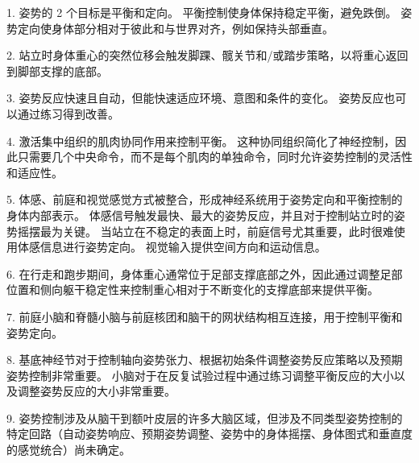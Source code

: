 1. 姿势的 2 个目标是平衡和定向。
平衡控制使身体保持稳定平衡，避免跌倒。
姿势定向使身体部分相对于彼此和与世界对齐，例如保持头部垂直。


2. 站立时身体重心的突然位移会触发脚踝、髋关节和/或踏步策略，以将重心返回到脚部支撑的底部。


3. 姿势反应快速且自动，但能快速适应环境、意图和条件的变化。
姿势反应也可以通过练习得到改善。


4. 激活集中组织的肌肉协同作用来控制平衡。
这种协同组织简化了神经控制，因此只需要几个中央命令，而不是每个肌肉的单独命令，同时允许姿势控制的灵活性和适应性。


5. 体感、前庭和视觉感觉方式被整合，形成神经系统用于姿势定向和平衡控制的身体内部表示。
体感信号触发最快、最大的姿势反应，并且对于控制站立时的姿势摇摆最为关键。
当站立在不稳定的表面上时，前庭信号尤其重要，此时很难使用体感信息进行姿势定向。
视觉输入提供空间方向和运动信息。


6. 在行走和跑步期间，身体重心通常位于足部支撑底部之外，因此通过调整足部位置和侧向躯干稳定性来控制重心相对于不断变化的支撑底部来提供平衡。


7. 前庭小脑和脊髓小脑与前庭核团和脑干的网状结构相互连接，用于控制平衡和姿势定向。


8. 基底神经节对于控制轴向姿势张力、根据初始条件调整姿势反应策略以及预期姿势控制非常重要。
小脑对于在反复试验过程中通过练习调整平衡反应的大小以及调整姿势反应的大小非常重要。


9. 姿势控制涉及从脑干到额叶皮层的许多大脑区域，但涉及不同类型姿势控制的特定回路（自动姿势响应、预期姿势调整、姿势中的身体摇摆、身体图式和垂直度的感觉统合）尚未确定。

